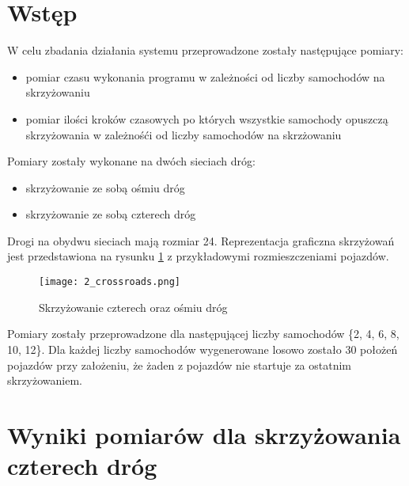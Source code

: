  \label{chap:outcomes}

\section{Wstęp}

W celu zbadania działania systemu przeprowadzone zostały następujące pomiary:

\begin{itemize}
\item pomiar czasu wykonania programu w zależności od liczby samochodów na skrzyżowaniu 
\item pomiar ilości kroków czasowych po których wszystkie samochody opuszczą skrzyżowania w zależnośći od liczby samochodów na skrzżowaniu
\end{itemize}

Pomiary zostały wykonane na dwóch sieciach dróg:
\begin{itemize}
\item skrzyżowanie ze sobą ośmiu dróg
\item skrzyżowanie ze sobą czterech dróg
\end{itemize}

Drogi na obydwu sieciach mają rozmiar 24.
\newline
\newline
Reprezentacja graficzna skrzyżowań jest przedstawiona na rysunku \ref{both-crossroads} z przykładowymi rozmieszczeniami pojazdów.
\begin{figure}[H]
    \texttt{[image: 2\_crossroads.png]}
  \caption{Skrzyżowanie czterech oraz ośmiu dróg}
  \label{both-crossroads}
\end{figure}

Pomiary zostały przeprowadzone dla następującej liczby samochodów \{2, 4, 6, 8, 10, 12\}.
\newline
\newline
Dla każdej liczby samochodów wygenerowane losowo zostało 30 położeń pojazdów przy założeniu, że żaden z pojazdów nie startuje za ostatnim skrzyżowaniem.

\section{Wyniki pomiarów dla skrzyżowania czterech dróg}

